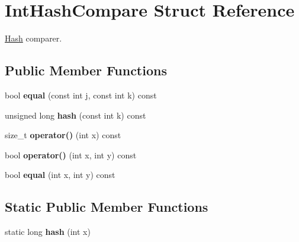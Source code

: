 \hypertarget{structIntHashCompare}{}\section{Int\+Hash\+Compare Struct Reference}
\label{structIntHashCompare}


\hyperlink{structHash}{Hash} comparer.  


\subsection*{Public Member Functions}
\begin{DoxyCompactItemize}
\item 
\hypertarget{structIntHashCompare_afe27b733f0cf07b8ea5bef9a57694a91}{}bool {\bfseries equal} (const int j, const int k) const \label{structIntHashCompare_afe27b733f0cf07b8ea5bef9a57694a91}

\item 
\hypertarget{structIntHashCompare_a09bd35067751b71e1194d09a1644e430}{}unsigned long {\bfseries hash} (const int k) const \label{structIntHashCompare_a09bd35067751b71e1194d09a1644e430}

\item 
\hypertarget{structIntHashCompare_a1e95cf6de7ff0b8a67003c608f14ffea}{}size\+\_\+t {\bfseries operator()} (int x) const \label{structIntHashCompare_a1e95cf6de7ff0b8a67003c608f14ffea}

\item 
\hypertarget{structIntHashCompare_a1a9aea4383c3ec5bddc2f645c6b17ecd}{}bool {\bfseries operator()} (int x, int y) const \label{structIntHashCompare_a1a9aea4383c3ec5bddc2f645c6b17ecd}

\item 
\hypertarget{structIntHashCompare_a82115ecba3163036249784bdfe1a4444}{}bool {\bfseries equal} (int x, int y) const \label{structIntHashCompare_a82115ecba3163036249784bdfe1a4444}

\end{DoxyCompactItemize}
\subsection*{Static Public Member Functions}
\begin{DoxyCompactItemize}
\item 
\hypertarget{structIntHashCompare_a348b567122b9dbc70e1fc79108a74320}{}static long {\bfseries hash} (int x)\label{structIntHashCompare_a348b567122b9dbc70e1fc79108a74320}

\end{DoxyCompactItemize}


